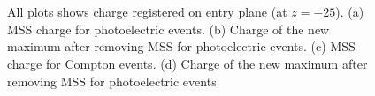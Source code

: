\begin{figure}[htb!]
        \begin{center}
                \\[-2ex]
                \\
                \caption{\label{fig.sipmmc} All plots shows charge registered on entry plane (at $z=-25$). (a) MSS charge for photoelectric events. (b) Charge of the new maximum after removing MSS for photoelectric events. (c) MSS charge for Compton events. (d) Charge of the new maximum after removing MSS for photoelectric events}
        \end{center}
\end{figure}


